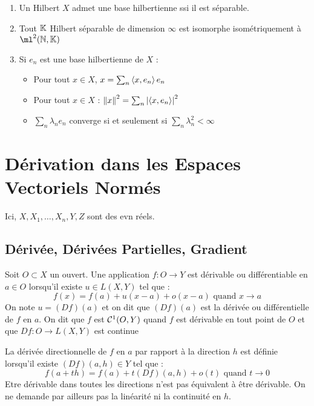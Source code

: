 \documentclass{cours}
\begin{document}
\begin{theorem}
    \begin{enumerate}
        \item Un Hilbert $X$ admet une base hilbertienne ssi il est séparable.
        \item Tout $\mathbb{K}$ Hilbert séparable de dimension $\infty$ est isomorphe isométriquement à $\ml^{2}(\N,\K)$
        \item Si $e_{n}$ est une base hilbertienne de $X$ :
              \begin{itemize}
                  \item Pour tout $x \in X$, $x = \sum_{n} \left\langle x, e_{n} \right\rangle e_{n}$
                  \item Pour tout $x \in X$ : $\left\lVert x \right\rVert^{2} = \sum_{n}\left|\left\langle x, e_{n} \right\rangle\right|^{2}$
                  \item $\sum_{n} \lambda_{n}e_{n}$ converge si et seulement si $\sum_{n} \lambda_{n}^{2} < \infty$
              \end{itemize}
    \end{enumerate}
\end{theorem}

\section{Dérivation dans les Espaces Vectoriels Normés}
Ici, $X, X_{1}, \ldots, X_{n}, Y, Z$ sont des evn réels.

\subsection{Dérivée, Dérivées Partielles, Gradient}
\begin{definition}
    Soit $O \subset X$ un ouvert. Une application $f : O \rightarrow Y$ est dérivable ou différentiable en $a \in O$ lorsqu'il existe $u \in L(X, Y)$ tel que :
    \[
        f(x) = f(a) + u(x - a) + o(x - a) \text{ quand } x \rightarrow a
    \]
    On note $u = (Df)(a)$ et on dit que $(Df)(a)$ est la dérivée ou différentielle de $f$ en $a$. On dit que $f$ est $\mathcal{C}^{1}(O, Y)$ quand $f$ est dérivable en tout point de $O$ et que $Df : O \rightarrow L(X, Y)$ est continue
\end{definition}

\begin{definition}
    La dérivée directionnelle de $f$ en $a$ par rapport à la direction $h$ est définie lorsqu'il existe $(Df)(a, h) \in Y$ tel que :
    \[
        f(a + th) = f(a) + t(Df)(a, h) + o(t) \text{ quand } t\rightarrow 0
    \]
    Etre dérivable dans toutes les directions n'est pas équivalent à être dérivable. On ne demande par ailleurs pas la linéarité ni la continuité en $h$.
\end{definition}
\end{document}
